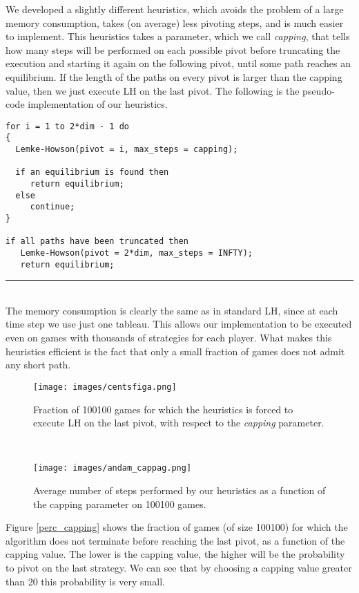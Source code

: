 \documentclass[11pt]{article}
\begin{document}
We developed a slightly different heuristics, which avoids the
problem of a large memory consumption, takes (on average) less
pivoting steps, and is much easier to implement.
This heuristics takes a parameter, which we call \textit{capping},
that tells how
many steps will be performed on each possible pivot before
truncating the execution and starting it again on the following
pivot, until some path reaches an equilibrium. If the length of the paths on every
pivot is larger than the capping value, then we just execute LH on
the last pivot. The following is the pseudo-code implementation
of our heuristics.

\noindent
\makebox[\textwidth]{\hrulefill}
\begin{verbatim}
for i = 1 to 2*dim - 1 do
{
  Lemke-Howson(pivot = i, max_steps = capping);

  if an equilibrium is found then
     return equilibrium;
  else
     continue;
}

if all paths have been truncated then
   Lemke-Howson(pivot = 2*dim, max_steps = INFTY);
   return equilibrium;
\end{verbatim}
\hrule\hfill\\

The memory consumption is clearly the same as in standard LH, since at each
time step we use just one tableau. This allows our implementation to
be executed even on games with thousands of strategies for each player.
What makes this heuristics efficient is the fact that only a small fraction
of games does not admit any short path.

\begin{figure}[h]
\begin{minipage}[t]{6.1cm}
\centering
\texttt{[image: images/centsfiga.png]}
\caption{Fraction of 100100 games for which the heuristics is
forced to execute LH on the last pivot, with respect to the
\emph{capping} parameter.}
\label{perc_capping}
\end{minipage}
\ \hspace{3mm} \hspace{4mm} \
\begin{minipage}[t]{6.1cm}
\centering
\texttt{[image: images/andam\_cappag.png]}
\caption{Average number of steps performed by our heuristics as a
function of the capping parameter on 100100 games.}
\label{steps_cap}
\end{minipage}
\end{figure}

Figure \ref{perc_capping} shows the fraction of games (of size
100100) for which the algorithm does not terminate before
reaching the last pivot, as a function of the capping value. The lower
is the capping value, the higher will be the probability to pivot on
the last strategy. We can see that by choosing a capping value greater
 than 20 this probability is very small.
\end{document}

